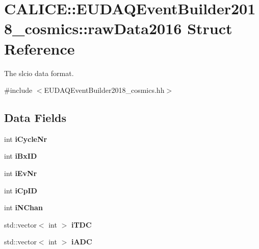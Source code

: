 \section{C\-A\-L\-I\-C\-E\-:\-:E\-U\-D\-A\-Q\-Event\-Builder2018\-\_\-cosmics\-:\-:raw\-Data2016 Struct Reference}
\label{structCALICE_1_1EUDAQEventBuilder2018__cosmics_1_1rawData2016}


The slcio data format.  




{\ttfamily \#include $<$E\-U\-D\-A\-Q\-Event\-Builder2018\-\_\-cosmics.\-hh$>$}

\subsection*{Data Fields}
\begin{DoxyCompactItemize}
\item 
int {\bfseries i\-Cycle\-Nr}\label{structCALICE_1_1EUDAQEventBuilder2018__cosmics_1_1rawData2016_abd9be451984a46dbcdad0a5db2ee49bc}

\item 
int {\bfseries i\-Bx\-I\-D}\label{structCALICE_1_1EUDAQEventBuilder2018__cosmics_1_1rawData2016_a61590df6b9ae8889c929b45cf747014e}

\item 
int {\bfseries i\-Ev\-Nr}\label{structCALICE_1_1EUDAQEventBuilder2018__cosmics_1_1rawData2016_ace73806ad02a0150af959d00595da619}

\item 
int {\bfseries i\-Cp\-I\-D}\label{structCALICE_1_1EUDAQEventBuilder2018__cosmics_1_1rawData2016_af25e5c9e45f0eec3637e2132c82350c3}

\item 
int {\bfseries i\-N\-Chan}\label{structCALICE_1_1EUDAQEventBuilder2018__cosmics_1_1rawData2016_a61c776c9884b89ea3da2abd3bf27d8ae}

\item 
std\-::vector$<$ int $>$ {\bfseries i\-T\-D\-C}\label{structCALICE_1_1EUDAQEventBuilder2018__cosmics_1_1rawData2016_a21ac10d5a303008b3c2667e5a834ec59}

\item 
std\-::vector$<$ int $>$ {\bfseries i\-A\-D\-C}\label{structCALICE_1_1EUDAQEventBuilder2018__cosmics_1_1rawData2016_a17735fe0201d9a610cb502fab2b723c9}

\end{DoxyCompactItemize}


